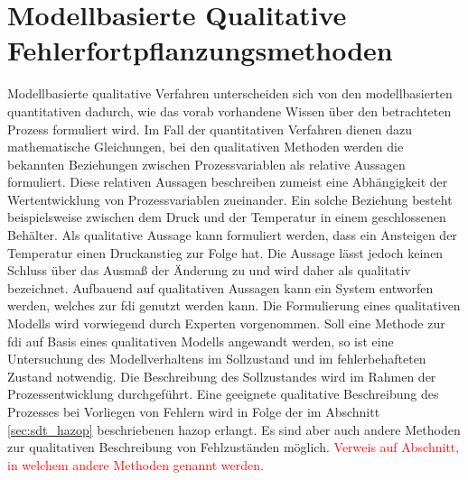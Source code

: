 \section{Modellbasierte Qualitative  Fehlerfortpflanzungsmethoden}\label{sec:fAna_modQual}
Modellbasierte qualitative Verfahren unterscheiden sich von den modellbasierten quantitativen dadurch, wie das vorab vorhandene Wissen \"uber den betrachteten Prozess formuliert wird. Im Fall der quantitativen Verfahren dienen dazu mathematische Gleichungen, bei den qualitativen Methoden werden die bekannten Beziehungen zwischen Prozessvariablen als relative Aussagen formuliert. Diese relativen Aussagen beschreiben zumeist eine Abh\"angigkeit der Wertentwicklung von Prozessvariablen zueinander. Ein solche Beziehung besteht beispielsweise zwischen dem Druck und der Temperatur in einem geschlossenen Beh\"alter. Als qualitative Aussage kann formuliert werden, dass ein Ansteigen der Temperatur einen Druckanstieg zur Folge hat. Die Aussage l\"asst jedoch keinen Schluss \"uber das Ausma\ss{} der \"Anderung zu und wird daher als qualitativ bezeichnet. \newline
Aufbauend auf qualitativen Aussagen kann ein System entworfen werden, welches zur \ac{fdi} genutzt werden kann. \newline
Die Formulierung eines qualitativen Modells wird vorwiegend durch Experten vorgenommen. Soll eine Methode zur \ac{fdi} auf Basis eines qualitativen Modells angewandt werden, so ist eine Untersuchung des Modellverhaltens im Sollzustand und im fehlerbehafteten Zustand notwendig. Die Beschreibung des Sollzustandes wird im Rahmen der Prozessentwicklung durchgef\"uhrt. Eine geeignete qualitative Beschreibung des Prozesses bei Vorliegen von Fehlern wird in Folge der im Abschnitt \ref{sec:sdt_hazop} beschriebenen \ac{hazop} erlangt. Es sind aber auch andere Methoden zur qualitativen Beschreibung von Fehlzust\"anden m\"oglich. \textcolor{red}{Verweis auf Abschnitt, in welchem andere Methoden genannt werden.}


